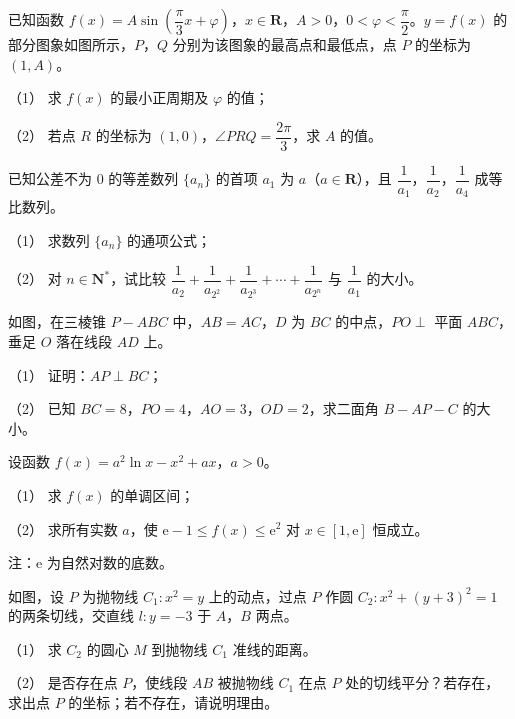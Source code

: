 \Needspace{0.4\textheight}
\begin{question}
已知函数 $f(x)=A\sin\left(\dfrac\pi3x+\varphi\right)$，$x\in\mathbf R$，$A>0$，$0<\varphi<\dfrac\pi2$。$y=f(x)$ 的部分图象如图所示，$P$，$Q$ 分别为该图象的最高点和最低点，点 $P$ 的坐标为 $(1,A)$。

（1） 求 $f(x)$ 的最小正周期及 $\varphi$ 的值；

（2） 若点 $R$ 的坐标为 $(1,0)$，$\angle PRQ=\dfrac{2\pi}3$，求 $A$ 的值。
\nopagebreak[4]
\begin{center}\end{center}
\nopagebreak[4]
\end{question}
\begin{question}
已知公差不为 $0$ 的等差数列 $\{a_n\}$ 的首项 $a_1$ 为 $a$（$a\in\mathbf R$），且 $\dfrac1{a_1}$，$\dfrac1{a_2}$，$\dfrac1{a_4}$ 成等比数列。

（1） 求数列 $\{a_n\}$ 的通项公式；

（2） 对 $n\in\mathbf N^*$，试比较 $\dfrac1{a_2}+\dfrac1{a_{2^2}}+\dfrac1{a_{2^3}}+\cdots+\dfrac1{a_{2^n}}$ 与 $\dfrac1{a_1}$ 的大小。

\Needspace{0.4\textheight}
\end{question}
\begin{question}
如图，在三棱锥 $P-ABC$ 中，$AB=AC$，$D$ 为 $BC$ 的中点，$PO\perp$ 平面 $ABC$，垂足 $O$ 落在线段 $AD$ 上。

（1） 证明：$AP\perp BC$；

（2） 已知 $BC=8$，$PO=4$，$AO=3$，$OD=2$，求二面角 $B-AP-C$ 的大小。
\nopagebreak[4]
\begin{center}\end{center}
\nopagebreak[4]
\end{question}
\begin{question}
设函数 $f(x)=a^2\ln x-x^2+ax$，$a>0$。

（1） 求 $f(x)$ 的单调区间；

（2） 求所有实数 $a$，使 $\mathrm e-1\leqslant f(x)\leqslant\mathrm e^2$ 对 $x\in[1,\mathrm e]$ 恒成立。

注：$\mathrm e$ 为自然对数的底数。

\Needspace{0.4\textheight}
\end{question}
\begin{question}
如图，设 $P$ 为抛物线 $C_1:x^2=y$ 上的动点，过点 $P$ 作圆 $C_2:x^2+(y+3)^2=1$ 的两条切线，交直线 $l:y=-3$ 于 $A$，$B$ 两点。

（1） 求 $C_2$ 的圆心 $M$ 到抛物线 $C_1$ 准线的距离。

（2） 是否存在点 $P$，使线段 $AB$ 被抛物线 $C_1$ 在点 $P$ 处的切线平分？若存在，求出点 $P$ 的坐标；若不存在，请说明理由。
\nopagebreak[4]
\begin{center}\end{center}
\nopagebreak[4]

\end{question}